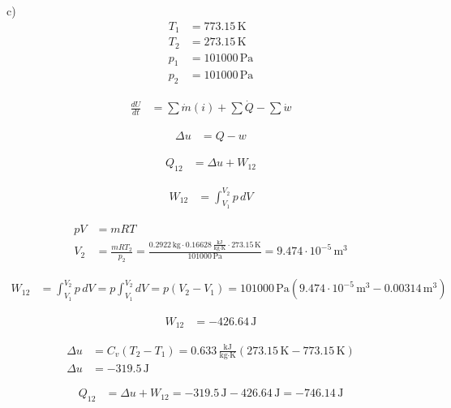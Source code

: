 c)
\begin{align*}
    T_1 &= 773.15 \, \text{K} \\
    T_2 &= 273.15 \, \text{K} \\
    p_1 &= 101000 \, \text{Pa} \\
    p_2 &= 101000 \, \text{Pa}
\end{align*}

\begin{align*}
    \frac{dU}{dt} &= \sum \dot{m}(i) + \sum \dot{Q} - \sum \dot{w}
\end{align*}

\begin{align*}
    \Delta u &= Q - w
\end{align*}

\begin{align*}
    Q_{12} &= \Delta u + W_{12}
\end{align*}

\begin{align*}
    W_{12} &= \int_{V_1}^{V_2} p \, dV
\end{align*}

\begin{align*}
    pV &= mRT \\
    V_2 &= \frac{mRT_2}{p_2} = \frac{0.2922 \, \text{kg} \cdot 0.16628 \, \frac{\text{kJ}}{\text{kg} \cdot \text{K}} \cdot 273.15 \, \text{K}}{101000 \, \text{Pa}} = 9.474 \cdot 10^{-5} \, \text{m}^3
\end{align*}

\begin{align*}
    W_{12} &= \int_{V_1}^{V_2} p \, dV = p \int_{V_1}^{V_2} dV = p (V_2 - V_1) = 101000 \, \text{Pa} \left(9.474 \cdot 10^{-5} \, \text{m}^3 - 0.00314 \, \text{m}^3 \right)
\end{align*}

\begin{align*}
    W_{12} &= -426.64 \, \text{J}
\end{align*}

\begin{align*}
    \Delta u &= C_v (T_2 - T_1) = 0.633 \, \frac{\text{kJ}}{\text{kg} \cdot \text{K}} (273.15 \, \text{K} - 773.15 \, \text{K}) \\
    \Delta u &= -319.5 \, \text{J}
\end{align*}

\begin{align*}
    Q_{12} &= \Delta u + W_{12} = -319.5 \, \text{J} - 426.64 \, \text{J} = -746.14 \, \text{J}
\end{align*}

